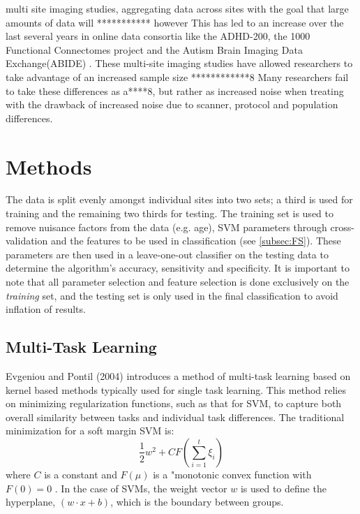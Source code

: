 \documentclass{llncs}
\begin{document}
multi site imaging studies, aggregating data across sites with the goal that large amounts of data will
*********** however   This has led to an increase over the last several years in online data consortia like the ADHD-200, the 1000 Functional Connectomes project and the Autism Brain Imaging Data Exchange(ABIDE) \cite{adhd}\cite{fcon}\cite{abide}.  These multi-site imaging studies have allowed researchers to take advantage of an increased sample size  ************8       Many researchers fail to take these differences as a****8, but rather as increased noise when treating with the drawback of increased noise due to scanner, protocol and population differences.
\section{Methods}
The data is split evenly amongst individual sites into two sets; a third is used for training and the remaining two thirds for testing.   The training set is used to remove nuisance factors from the data (e.g. age), SVM parameters through cross-validation and the features to be used in classification (see \ref{subsec:FS}).  These parameters are then used in a leave-one-out classifier on the testing data to determine the algorithm's accuracy, sensitivity and specificity. It is important to note that all parameter selection and feature selection is done exclusively on the \textit{training} set, and the testing set is only used in the final classification to avoid inflation of results.

\subsection{Multi-Task Learning}
Evgeniou and Pontil (2004) introduces a method of multi-task learning based on kernel based methods typically used for single task learning.  This method relies on minimizing regularization functions, such as that for SVM, to capture both overall similarity between tasks and individual task differences.  The traditional minimization for a soft margin SVM is:\\
\begin{equation}
\label{eq:svm}
\frac{1}{2}w^2 + C F(\sum_{i=1}^t \xi_i)
\end{equation}
where $C$ is a constant and $F(\mu)$ is a "monotonic convex function with $F(0)=0$ \cite{svm}. In the case of SVMs, the weight vector $w$ is used to define the hyperplane, $(w \cdot x +b)$,  which is the boundary between groups.
\end{document}

